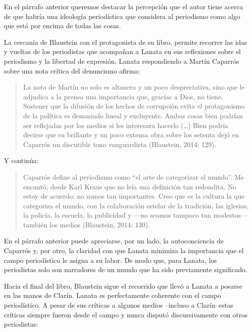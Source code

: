 {En el párrafo anterior queremos destacar la percepción que el autor tiene acerca de que habría una ideología periodística que considera al periodismo como algo que está por encima de todas las cosas.

La cercanía de Blaustein con el protagonista de su libro, permite recorrer las idas y vueltas de los periodistas que acompañan a Lanata en sus reflexiones sobre el periodismo y la libertad de expresión. Lanata respondiendo a Martín Caparrós sobre una nota crítica del denuncismo afirma:

\begin{quote}
La nota de Martín no solo es altanera y un poco despreciativa, sino que le adjudica a la prensa una importancia que, gracias a Dios, no tiene. Sostener que la difusión de los hechos de corrupción evita el protagonismo de la política es demasiado lineal y excluyente. Ambas cosas bien podrían ser reflejadas por los medios si les interesara hacerlo (\ldots) Bien podría decirse que su brillante y un poco extensa obra sobre los setenta dejó en Caparrós un discutible tono vanguardista (Blaustein, 2014: 129).
\end{quote}

Y continúa:

\begin{quote}
Caparrós define al periodismo como ``el arte de categorizar el mundo''. Me encantó; desde Karl Kraus que no leía una definición tan redondita. No estoy de acuerdo: no somos tan importantes. Creo que es la cultura la que categoriza el mundo, con la colaboración estelar de la tradición, las iglesias, la policía, la escuela, la publicidad y ---no seamos tampoco tan modestos--- también los medios (Blaustein, 2014: 130).
\end{quote}

En el párrafo anterior puede apreciarse, por un lado, la autoconciencia de Caparrós y, por otro, la claridad con que Lanata minimiza la importancia que el campo periodístico le asigna a su labor. De modo que, para Lanata, los periodistas solo son narradores de un mundo que ha sido previamente significado.

Hacia el final del libro, Blaustein sigue el recorrido que llevó a Lanata a posarse en las manos de Clarín. Lanata es perfectamente coherente con el campo periodístico. A pesar de sus críticas a algunos medios --incluso a Clarín--estas críticas siempre fueron desde el campo y nunca disputó discursivamente con otros periodistas:

}
